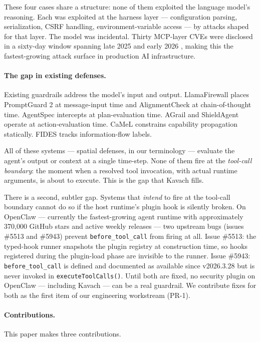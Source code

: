 These four cases share a structure: none of them exploited the language model's
reasoning. Each was exploited at the harness layer — configuration parsing,
serialization, CSRF handling, environment-variable access — by attacks shaped
for that layer. The model was incidental. Thirty MCP-layer CVEs were disclosed
in a sixty-day window spanning late 2025 and early 2026 \cite{agentauditkit2026},
making this the fastest-growing attack surface in production AI infrastructure.

\paragraph{The gap in existing defenses.}
Existing guardrails address the model's input and output. LlamaFirewall
\cite{saxe2025llamafirewall} places PromptGuard 2 at message-input time and
AlignmentCheck at chain-of-thought time. AgentSpec \cite{wang2025agentspec}
intercepts at plan-evaluation time. AGrail \cite{luo2025agrail} and
ShieldAgent \cite{chen2025shieldagent} operate at action-evaluation time.
CaMeL \cite{debenedetti2025camel} constrains capability propagation
statically. FIDES \cite{costa2025fides} tracks information-flow labels.

All of these systems — spatial defenses, in our terminology — evaluate
the agent's output or context at a single time-step. None of them fire at the
\emph{tool-call boundary}: the moment when a resolved tool invocation, with
actual runtime arguments, is about to execute. This is the gap that Kavach fills.

There is a second, subtler gap. Systems that \emph{intend} to fire at the
tool-call boundary cannot do so if the host runtime's plugin hook is silently
broken. On OpenClaw — currently the fastest-growing agent runtime
\cite{thenewstack2026openclaw} with approximately 370,000 GitHub stars and
active weekly releases — two upstream bugs (issues \#5513 and \#5943) prevent
\texttt{before\_tool\_call} from firing at all. Issue \#5513: the typed-hook
runner snapshots the plugin registry at construction time, so hooks registered
during the plugin-load phase are invisible to the runner. Issue \#5943:
\texttt{before\_tool\_call} is defined and documented as available since
v2026.3.28 but is never invoked in \texttt{executeToolCalls()}. Until both are
fixed, no security plugin on OpenClaw — including Kavach — can be a real
guardrail. We contribute fixes for both as the first item of our engineering
workstream (PR-1).

\paragraph{Contributions.} This paper makes three contributions.

